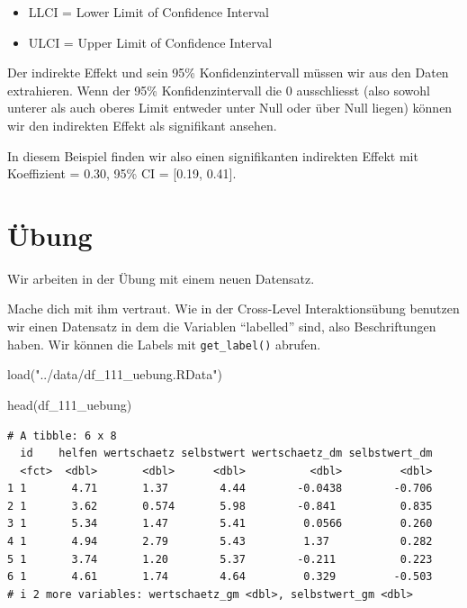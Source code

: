 \documentclass[
  letterpaper,
  DIV=11,
  numbers=noendperiod]{scrreprt}
\newenvironment{Shaded}{\begin{snugshade}}{\end{snugshade}}
\newcommand{\FunctionTok}[1]{\textcolor[rgb]{0.28,0.35,0.67}{#1}}
\newcommand{\NormalTok}[1]{\textcolor[rgb]{0.00,0.23,0.31}{#1}}
\newcommand{\StringTok}[1]{\textcolor[rgb]{0.13,0.47,0.30}{#1}}
\providecommand{\tightlist}{%
  \setlength{\itemsep}{0pt}\setlength{\parskip}{0pt}}\usepackage{longtable,booktabs,array}
\begin{document}
\begin{itemize}
\tightlist
\item
  LLCI = Lower Limit of Confidence Interval
\item
  ULCI = Upper Limit of Confidence Interval
\end{itemize}

Der indirekte Effekt und sein 95\% Konfidenzintervall müssen wir aus den
Daten extrahieren. Wenn der 95\% Konfidenzintervall die 0 ausschliesst
(also sowohl unterer als auch oberes Limit entweder unter Null oder über
Null liegen) können wir den indirekten Effekt als signifikant ansehen.

In diesem Beispiel finden wir also einen signifikanten indirekten Effekt
mit Koeffizient = 0.30, 95\% CI = {[}0.19, 0.41{]}.

\section{Übung}\label{uxfcbung-3}

Wir arbeiten in der Übung mit einem neuen Datensatz.

Mache dich mit ihm vertraut. Wie in der Cross-Level Interaktionsübung
benutzen wir einen Datensatz in dem die Variablen ``labelled'' sind,
also Beschriftungen haben. Wir können die Labels mit
\texttt{get\_label()} abrufen.

\begin{Shaded}
\begin{Highlighting}[]
\FunctionTok{load}\NormalTok{(}\StringTok{"../data/df\_111\_uebung.RData"}\NormalTok{)}

\FunctionTok{head}\NormalTok{(df\_111\_uebung)}
\end{Highlighting}
\end{Shaded}

\begin{verbatim}
# A tibble: 6 x 8
  id    helfen wertschaetz selbstwert wertschaetz_dm selbstwert_dm
  <fct>  <dbl>       <dbl>      <dbl>          <dbl>         <dbl>
1 1       4.71       1.37        4.44        -0.0438        -0.706
2 1       3.62       0.574       5.98        -0.841          0.835
3 1       5.34       1.47        5.41         0.0566         0.260
4 1       4.94       2.79        5.43         1.37           0.282
5 1       3.74       1.20        5.37        -0.211          0.223
6 1       4.61       1.74        4.64         0.329         -0.503
# i 2 more variables: wertschaetz_gm <dbl>, selbstwert_gm <dbl>
\end{verbatim}
\end{document}
